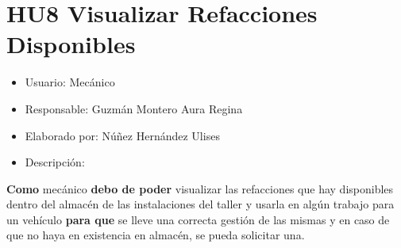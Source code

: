 \section{HU8 Visualizar Refacciones Disponibles}
\begin{itemize}
	\item Usuario: Mecánico
	\item Responsable: Guzmán Montero Aura Regina
	\item Elaborado por: Núñez Hernández Ulises
	\item Descripción:\\
\end{itemize}

\textbf{Como} mecánico \textbf{debo de poder} visualizar las refacciones que hay disponibles dentro del almacén de las instalaciones del taller y usarla en algún trabajo para un vehículo \textbf{para que} se lleve una correcta gestión de las mismas y en caso de que no haya en existencia en almacén, se pueda solicitar una. 